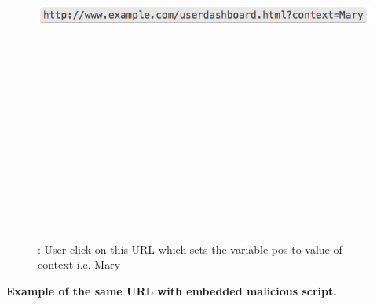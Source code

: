 \begin{figure}[htb]
\centering
\includegraphics[width=15cm,height=15cm,keepaspectratio]{image/dxss2.png}
\caption[DOM based cross-site scripting attack example ]{: User click on this URL which sets the variable pos to value of context i.e. Mary ~\cite{g20}} 
\label{fig:dxss2}
\end{figure}

\newpage

{\bf Example of the same URL with embedded malicious script.}

\bigskip

